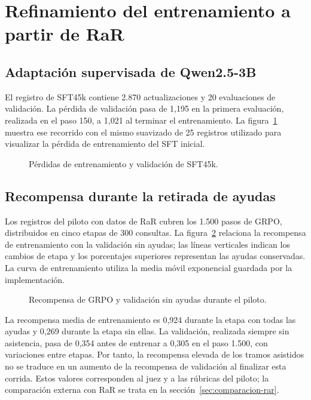 \section{Refinamiento del entrenamiento a partir de RaR}
\label{sec:refinamiento-entrenamiento-rar}
\subsection{Adaptación supervisada de Qwen2.5-3B}
El registro de SFT45k contiene 2.870 actualizaciones y 20 evaluaciones de validación. La pérdida de validación pasa de 1,195 en la primera evaluación, realizada en el paso 150, a 1,021 al terminar el entrenamiento. La figura~\ref{fig:sft45k-curvas} muestra ese recorrido con el mismo suavizado de 25 registros utilizado para visualizar la pérdida de entrenamiento del SFT inicial.

\begin{figure}[htbp]
\centering

\caption{Pérdidas de entrenamiento y validación de SFT45k.}
\label{fig:sft45k-curvas}
\end{figure}

\subsection{Recompensa durante la retirada de ayudas}
Los registros del piloto con datos de RaR cubren los 1.500 pasos de GRPO, distribuidos en cinco etapas de 300 consultas. La figura~\ref{fig:grpo-piloto-curvas} relaciona la recompensa de entrenamiento con la validación sin ayudas; las líneas verticales indican los cambios de etapa y los porcentajes superiores representan las ayudas conservadas. La curva de entrenamiento utiliza la media móvil exponencial guardada por la implementación.

\begin{figure}[htbp]
\centering

\caption{Recompensa de GRPO y validación sin ayudas durante el piloto.}
\label{fig:grpo-piloto-curvas}
\end{figure}

La recompensa media de entrenamiento es 0,924 durante la etapa con todas las ayudas y 0,269 durante la etapa sin ellas. La validación, realizada siempre sin asistencia, pasa de 0,354 antes de entrenar a 0,305 en el paso 1.500, con variaciones entre etapas. Por tanto, la recompensa elevada de los tramos asistidos no se traduce en un aumento de la recompensa de validación al finalizar esta corrida. Estos valores corresponden al juez y a las rúbricas del piloto; la comparación externa con RaR se trata en la sección~\ref{sec:comparacion-rar}.
